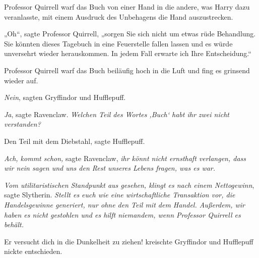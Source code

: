 Professor Quirrell warf das Buch von einer Hand in die andere, was Harry dazu veranlasste, mit einem Ausdruck des Unbehagens die Hand auszustrecken.

„Oh“, sagte Professor Quirrell, „sorgen Sie sich nicht um etwas rüde Behandlung. Sie könnten dieses Tagebuch in eine Feuerstelle fallen lassen und es würde unversehrt wieder herauskommen. In jedem Fall erwarte ich Ihre Entscheidung.“

Professor Quirrell warf das Buch beiläufig hoch in die Luft und fing es grinsend wieder auf.

\emph{Nein}, sagten Gryffindor und Hufflepuff.

\emph{Ja}, sagte Ravenclaw. \emph{Welchen Teil des Wortes ‚Buch‘ habt ihr zwei nicht verstanden?}

Den Teil mit dem Diebstahl, sagte Hufflepuff.

\emph{Ach, kommt schon,} sagte Ravenclaw, \emph{ihr könnt nicht ernsthaft verlangen, dass wir nein sagen und uns den Rest unseres Lebens fragen, was es war.}

\emph{Vom utilitaristischen Standpunkt aus gesehen, klingt es nach einem Nettogewinn}, sagte Slytherin. \emph{Stellt es euch wie eine wirtschaftliche Transaktion vor, die Handelsgewinne generiert, nur ohne den Teil mit dem Handel. Außerdem, \emph{wir} haben es nicht gestohlen und es hilft niemandem, wenn Professor Quirrell es behält.}

Er versucht dich in die Dunkelheit zu ziehen! kreischte Gryffindor und Hufflepuff nickte entschieden.

